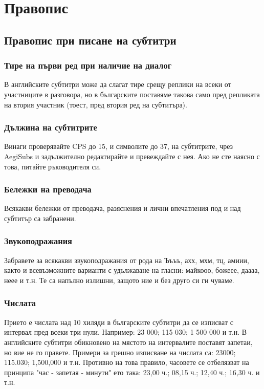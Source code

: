 \chapter{Правопис}

\section{Правопис при писане на субтитри}

\subsection{Тире на първи ред при наличие на диалог}
В английските субтитри може да слагат тире срещу реплики на всеки от участниците в разговора, но в българските поставяме такова само пред репликата на втория участник (тоест, пред втория ред на субтитъра).

\subsection{Дължина на субтитрите}
Винаги проверявайте CPS до 15, и символите до 37, на субтитрите, чрез AegiSubs и задължително редактирайте и превеждайте с нея. Ако не сте наясно с това, питайте ръководителя си.

\subsection{Бележки на преводача}
Всякакви бележки от преводача, разяснения и лични впечатления под и над субтитър са забранени.

\subsection{Звукоподражания}
Забравете за всякакви звукоподражания от рода на Ъъъъ, ахх, мхм, тц, амиии, както и всевъзможните варианти с удължаване на гласни: майкооо, божеее, даааа, неее и т.н. Те са напълно излишни, защото ние и без друго си ги чуваме.

\subsection{Числата}
Прието е числата над 10 хиляди в българските субтитри да се изписват с интервал пред всеки три нули. Например: 23 000; 115 030; 1 500 000 и т.н. В английските субтитри обикновено на мястото на интервалите поставят запетаи, но вие не го правете. Примери за грешно изписване на числата са: 23000; 115.030; 1,500,000 и т.н. Противно на това правило, часовете се отбелязват на принципа "час - запетая - минути" ето така: 23,00 ч.; 08,15 ч.; 12,40 ч.; 16,30 ч. и т.н.

